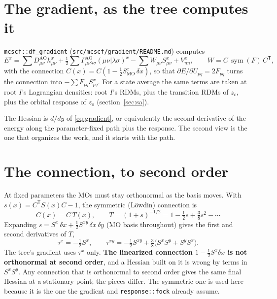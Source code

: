 \documentclass[11pt]{article}
\newcommand{\code}[1]{\texttt{#1}}
\newcommand{\sym}{\operatorname{sym}}
\begin{document}
\section{The gradient, as the tree computes it}
\label{sec:gradient}

\code{mcscf::df\_gradient} (\code{src/mcscf/gradient/README.md}) computes
\begin{equation}
  E^x = \sum D^{\mathrm{AO}}_{\mu\nu} h^x_{\mu\nu}
  + \tfrac12\sum \Gamma^{\mathrm{AO}}_{\mu\nu\lambda\sigma}
    (\mu\nu|\lambda\sigma)^x
  - \sum W_{\mu\nu} S^x_{\mu\nu} + V_{nn}^x,
  \qquad W = C\,\sym(F)\,C^{\mathsf T},
  \label{eq:gradient}
\end{equation}
with the connection $C(x) = C(1 - \frac12 S^x_{\mathrm{MO}}\,\delta x)$,
so that $\partial E/\partial U_{pq} = 2F_{pq}$ turns the connection into
$-\sum F_{pq}S^x_{pq}$. For a state average the same terms are taken at
root $I$'s Lagrangian densities: root $I$'s RDMs, plus the transition RDMs
of $z_c$, plus the orbital response of $z_o$
(section~\ref{sec:sa}).

The Hessian is $d/dy$ of \eqref{eq:gradient}, or equivalently the second
derivative of the energy along the parameter-fixed path plus the response.
The second view is the one that organizes the work, and it starts with the
path.

\section{The connection, to second order}
\label{sec:connection}

At fixed parameters the MOs must stay orthonormal as the basis moves. With
$s(x) = C^{\mathsf T}S(x)C - 1$, the symmetric (L\"owdin) connection is
\begin{equation}
  C(x) = C\,T(x), \qquad
  T = (1+s)^{-1/2} = 1 - \tfrac12 s + \tfrac38 s^2 - \cdots
\end{equation}
Expanding $s = S^x\,\delta x + \frac12 S^{xy}\,\delta x\,\delta y$ (MO
basis throughout) gives the first and second derivatives of $T$,
\begin{equation}
  \tau^x = -\tfrac12 S^x, \qquad
  \tau^{xy} = -\tfrac12 S^{xy} + \tfrac38\bigl(S^xS^y + S^yS^x\bigr).
  \label{eq:tau}
\end{equation}
The tree's gradient uses $\tau^x$ only. \textbf{The linearized connection
$1 - \frac12 S^x\delta x$ is not orthonormal at second order}, and a
Hessian built on it is wrong by terms in $S^xS^y$. Any connection that is
orthonormal to second order gives the same final Hessian at a stationary
point; the pieces differ. The symmetric one is used here because it is the
one the gradient and \code{response::fock} already assume.
\end{document}
